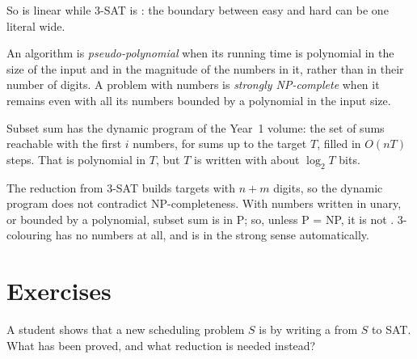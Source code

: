 So  is linear while 3-SAT is : the boundary between easy and hard can be one literal wide.

\begin{definition}\label{def:b3:np-completeness:pseudo}
An algorithm is \emph{pseudo-polynomial} when its running time is polynomial in the size of the input and in the magnitude of the numbers in it, rather than in their number of digits. A problem with numbers is \emph{strongly NP-complete} when it remains  even with all its numbers bounded by a polynomial in the input size.
\end{definition}

Subset sum has the dynamic program of the Year~1 volume: the set of sums reachable with the first $i$ numbers, for sums up to the target $T$, filled in $O(nT)$ steps. That is polynomial in $T$, but $T$ is written with about $\log_2 T$ bits.

\label{lst:b3:np-completeness:dp}

\label{out:b3:np-completeness:dp}

The reduction from 3-SAT builds targets with $n + m$ digits, so the dynamic program does not contradict NP-completeness. With numbers written in unary, or bounded by a polynomial, subset sum is in P; so, unless P = NP, it is not . 3-colouring has no numbers at all, and is  in the strong sense automatically.

\section{Exercises}\label{sec:b3:np-completeness:exercises}

\begin{exercise}[$\star$]\label{exo:b3:np-completeness:1}
A student shows that a new scheduling problem $S$ is  by writing a  from $S$ to SAT. What has been proved, and what reduction is needed instead?
\end{exercise}

